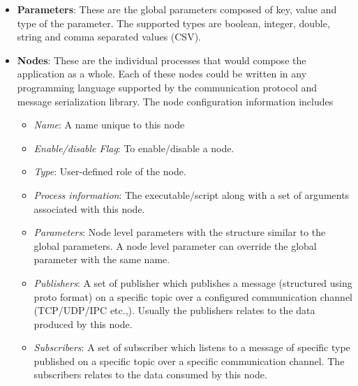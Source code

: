 \begin{itemize}
\item \textbf{Parameters}: These are the global parameters composed of key, value and type of the parameter. The supported types are boolean, integer, double, string and comma separated values (CSV). 
\item \textbf{Nodes}: These are the individual processes that would compose the application as a whole. Each of these nodes could be written in any programming language supported by the communication protocol and message serialization library. The node configuration information includes
\begin{itemize}
\item \emph{Name}: A name unique to this node
\item \emph{Enable/disable Flag}: To enable/disable a node.
\item \emph{Type}: User-defined role of the node.
\item \emph{Process information}: The executable/script along with a set of arguments associated with this node.
\item \emph{Parameters}: Node level parameters with the structure similar to the global parameters. A node level parameter can override the global parameter with the same name.
\item \emph{Publishers}: A set of publisher which publishes a message (structured using proto format) on a specific topic over a configured communication channel (TCP/UDP/IPC etc.,). Usually the publishers relates to the data produced by this node.
\item \emph{Subscribers}: A set of subscriber which listens to a message of specific type published on a specific topic over a specific communication channel. The subscribers relates to the data consumed by this node.
\end{itemize}
\end{itemize}
